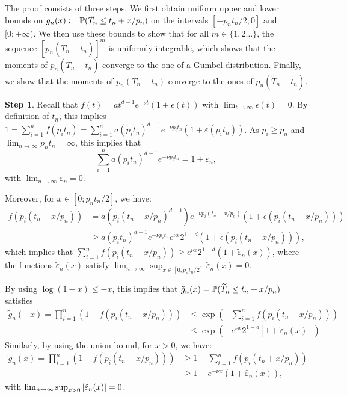 \documentclass{aptpub}
\newcommand\proba[1]{\mathchoice{\bproba{#1}}{\sproba{#1}}{\sproba{#1}}{\sproba{#1}}}
\newcommand\bproba[1]{\mathbb{P}\left(#1\right)}
\newcommand\sproba[1]{\mathbb{P}(#1)}
\newcommand\abs[1]{\mathchoice{\babs{#1}}{\sabs{#1}}{\sabs{#1}}{\sabs{#1}}}
\newcommand\babs[1]{\left|#1\right|}
\newcommand\sabs[1]{|#1|}
\begin{document}
  The proof consists of three steps. We first obtain uniform upper and
  lower bounds on $g_n(x):=\proba{\tilde{T_n}\le t_n+x/p_n}$ on the
  intervals $[-p_nt_n/2;0]$ and $[0;+\infty)$. We then use these
  bounds to show that for all $m\in\{1,2\dots\}$, the sequence
  $[p_n(\tilde T_n-t_n)]^m$ is uniformly integrable, which shows that
  the moments of $p_n(\tilde T_n-t_n)$ converge to the one of a Gumbel
  distribution. Finally, we show that the moments of $p_n(T_n-t_n)$
  converge to the ones of $p_n(\tilde T_n-t_n)$.

  \textbf{Step 1}. Recall that
  $f(t)=at^{d-1}e^{-\nu t}(1+\epsilon(t))$ with
  $\lim_{t\to\infty}\epsilon(t)=0$. By definition of $t_n$, this
  implies
  $1=\sum_{i=1}^n f(p_it_n)=\sum_{i=1}^n a (p_it_n)^{d-1}e^{-\nu p_i
    t_n} (1+\varepsilon(p_it_n))$.
  As $p_i\ge p_n$ and $\lim_{n\to\infty}p_nt_n=\infty$, this implies
  that
  \begin{equation*}
    \sum_{i=1}^n a (p_it_n)^{d-1}e^{-\nu p_i t_n}=1+\varepsilon_n,
  \end{equation*}
  with $\lim_{n\to\infty}\varepsilon_n=0$.

  Moreover, for $x\in[0;p_nt_n/2]$, we have:
  \begin{align*}
    f(p_i(t_n-x/p_n))%
 &=a(p_i(t_n-x/p_n)^{d-1})e^{-\nu p_i(t_n-x/p_n)}(1+\epsilon(p_i(t_n-x/p_n)))\\
      &\ge a(p_it_n)^{d-1}e^{-\nu p_i t_n}e^{\nu x}2^{1-d}(1+\epsilon(p_i(t_n-x/p_n))),
  \end{align*}
  which implies that
  $\sum_{i=1}^n f(p_i(t_n-x/p_n)) \ge e^{\nu x}
  2^{1-d}(1+\tilde{\varepsilon}_n(x))$,
  where the functions $\tilde\varepsilon_n(x)$ satisfy
  $\lim_{n\to\infty}\sup_{x\in[0;p_nt_n/2]}\tilde\varepsilon_n(x)=0$.

  By using $\log(1-x)\le-x$, this implies that
  $\tilde g_n(x) = \proba{\widetilde{T}_n\le t_n+x/p_n}$ satisfies
  \begin{align}
    \tilde g_n(-x)  =\prod_{i=1}^n (1-f(p_i(t_n-x/p_n))) 
    &  \le \exp( - \sum_{i=1}^n f(p_i(t_n-x/p_n))) \nonumber\\
    &\le \exp( - e^{\nu x}2^{1-d} [1+\tilde\varepsilon_n(x)])\label{eq:exp_bound}
  \end{align}
  Similarly, by using the union bound, for $x>0$, we have:
  \begin{align}
    \tilde g_n(x)  =\prod_{i=1}^n (1-f(p_i(t_n+x/p_n))) 
              &\ge 1- \sum_{i=1}^n f(p_i(t_n+x/p_n)) \nonumber\\
            &\ge 1 - e^{-\nu x} (1+\hat\varepsilon_n(x)), \label{eq:union}
  \end{align}
  with $\lim_{n\to\infty}\sup_{x>0}\abs{\hat\varepsilon_n(x)}=0$. 
\end{document}
